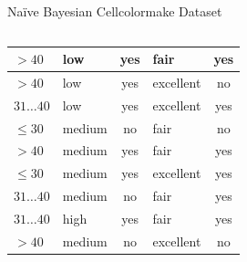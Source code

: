 \documentclass[aspectratio=169,t,table]{beamer}
\begin{document}
{\begin{frame}{Naïve Bayesian Cellcolormake Dataset}
\begin{columns}
\begin{column}{0.6\textwidth}
{\begin{tabular}{|l|l|c|l|c|}
            \cellcolor{yellow!20}$>40$ & \cellcolor{yellow!20}low & \cellcolor{yellow!20}yes & \cellcolor{yellow!20}fair & \cellcolor{green!20}yes \\\hline
            \cellcolor{yellow!20}$>40$ & \cellcolor{yellow!20}low & \cellcolor{yellow!20}yes & \cellcolor{yellow!20}excellent & \cellcolor{red!20}no \\\hline
            \cellcolor{yellow!20}$31\ldots40$ & \cellcolor{yellow!20}low & \cellcolor{yellow!20}yes & \cellcolor{yellow!20}excellent & \cellcolor{green!20}yes \\\hline
            \cellcolor{yellow!20}$\leq30$ & \cellcolor{yellow!20}medium & \cellcolor{yellow!20}no & \cellcolor{yellow!20}fair & \cellcolor{red!20}no \\\hline
            \cellcolor{yellow!20}$>40$ & \cellcolor{yellow!20}medium & \cellcolor{yellow!20}yes & \cellcolor{yellow!20}fair & \cellcolor{green!20}yes \\\hline
            \cellcolor{yellow!20}$\leq30$ & \cellcolor{yellow!20}medium & \cellcolor{yellow!20}yes & \cellcolor{yellow!20}excellent & \cellcolor{green!20}yes \\\hline
            \cellcolor{yellow!20}$31\ldots40$ & \cellcolor{yellow!20}medium & \cellcolor{yellow!20}no & \cellcolor{yellow!20}fair & \cellcolor{green!20}yes \\\hline
            \cellcolor{yellow!20}$31\ldots40$ & \cellcolor{yellow!20}high & \cellcolor{yellow!20}yes & \cellcolor{yellow!20}fair & \cellcolor{green!20}yes \\\hline
            \cellcolor{yellow!20}$>40$ & \cellcolor{yellow!20}medium & \cellcolor{yellow!20}no & \cellcolor{yellow!20}excellent & \cellcolor{red!20}no \\\hline
          \end{tabular}}
        \end{column}
      \end{columns}
    \end{frame}
  }
\end{document}
